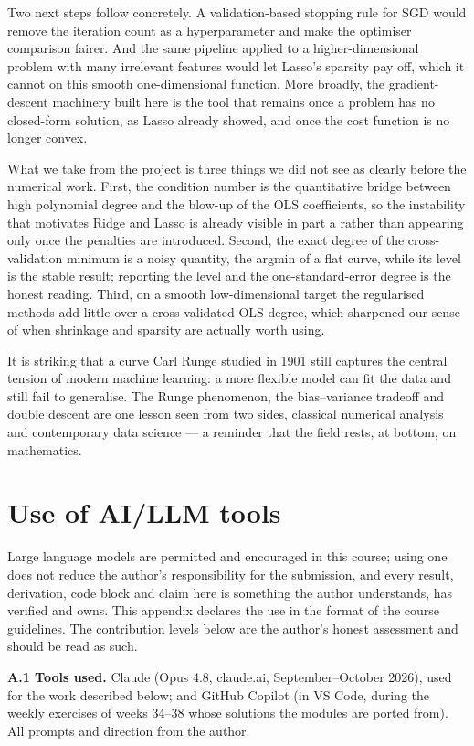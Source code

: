 \documentclass[a4paper,11pt]{article}
\begin{document}
Two next steps follow concretely. A validation-based stopping rule for SGD would
remove the iteration count as a hyperparameter and make the optimiser comparison
fairer. And the same pipeline applied to a higher-dimensional problem with many
irrelevant features would let Lasso's sparsity pay off, which it cannot on this
smooth one-dimensional function. More broadly, the gradient-descent machinery
built here is the tool that remains once a problem has no closed-form solution, as
Lasso already showed, and once the cost function is no longer convex.

What we take from the project is three things we did not see as clearly before
the numerical work. First, the condition number is the quantitative bridge
between high polynomial degree and the blow-up of the OLS coefficients, so the
instability that motivates Ridge and Lasso is already visible in part a rather
than appearing only once the penalties are introduced. Second, the exact degree
of the cross-validation minimum is a noisy quantity, the argmin of a flat curve,
while its level is the stable result; reporting the level and the
one-standard-error degree is the honest reading. Third, on a smooth low-dimensional target the regularised
methods add little over a cross-validated OLS degree, which sharpened our sense of
when shrinkage and sparsity are actually worth using.

It is striking that a curve Carl Runge studied in 1901 still captures the central
tension of modern machine learning: a more flexible model can fit the data and
still fail to generalise. The Runge phenomenon, the bias--variance tradeoff and
double descent are one lesson seen from two sides, classical numerical analysis
and contemporary data science --- a reminder that the field rests, at bottom, on
mathematics.

\appendix
\section{Use of AI/LLM tools}
Large language models are permitted and encouraged in this course; using one
does not reduce the author's responsibility for the submission, and every
result, derivation, code block and claim here is something the author
understands, has verified and owns. This appendix declares the use in the format
of the course guidelines. The contribution levels below are the author's honest
assessment and should be read as such.

\noindent\textbf{A.1 Tools used.} Claude (Opus 4.8, claude.ai, September--October
2026), used for the work described below; and GitHub Copilot (in VS Code, during
the weekly exercises of weeks 34--38 whose solutions the modules are ported
from). All prompts and direction from the author.
\end{document}
